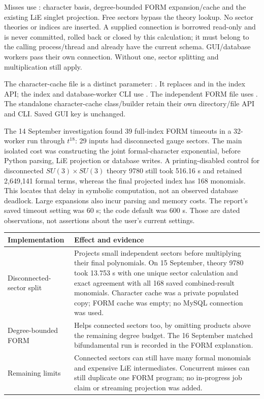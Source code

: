Misses use : character basis, degree-bounded FORM
expansion/cache and the existing LiE singlet projection. Free sectors bypass
the theory lookup. No sector theories or indices are inserted. A supplied
connection is borrowed read-only and is never committed, rolled back or closed
by this calculation; it must belong to the calling process/thread and already
have the current schema. GUI/database workers pass their own connection.
Without one, sector splitting and multiplication still apply.

The character-cache file is a distinct parameter:
. It replaces  and
 in the index API; the index and database-worker CLI use
. The independent FORM file uses
. The standalone character-cache class/builder
retain their own directory/file API and CLI. Saved GUI key
 is unchanged.

\clearpage
{}
The 14 September investigation found 39 full-index FORM timeouts in a
32-worker run through $t^{18}$: 29 inputs had disconnected gauge sectors.
The main isolated cost was constructing the joint formal-character exponential,
before Python parsing, LiE projection or database writes. A printing-disabled
control for disconnected $SU(3)\times SU(3)$ theory 9780 still took 516.16 s
and retained 2,649,141 formal terms, whereas the final projected index has
168 monomials. This locates that delay in symbolic computation, not an
observed database deadlock. Large expansions also incur parsing and memory
costs. The report's saved timeout setting was 60 s; the code default was 600 s.
Those are dated observations, not assertions about the user's current settings.

\begin{tabularx}{\textwidth}{@{}>{\raggedright\arraybackslash}p{39mm}Y@{}}
\toprule Implementation & Effect and evidence\\\midrule
Disconnected-sector split & Projects small independent sectors before
multiplying their final polynomials. On 15 September, theory 9780 took
13.753 s with one unique sector calculation and exact agreement with all
168 saved combined-result monomials. Character cache was a private populated
copy; FORM cache was empty; no MySQL connection was used.\\
Degree-bounded FORM & Helps connected sectors too, by omitting products
above the remaining degree budget. The 16 September matched bifundamental
run is recorded in the FORM explanation.\\
Remaining limits & Connected sectors can still have many formal monomials
and expensive LiE intermediates. Concurrent misses can still duplicate one
FORM program; no in-progress job claim or streaming projection was added.\\\bottomrule
\end{tabularx}

